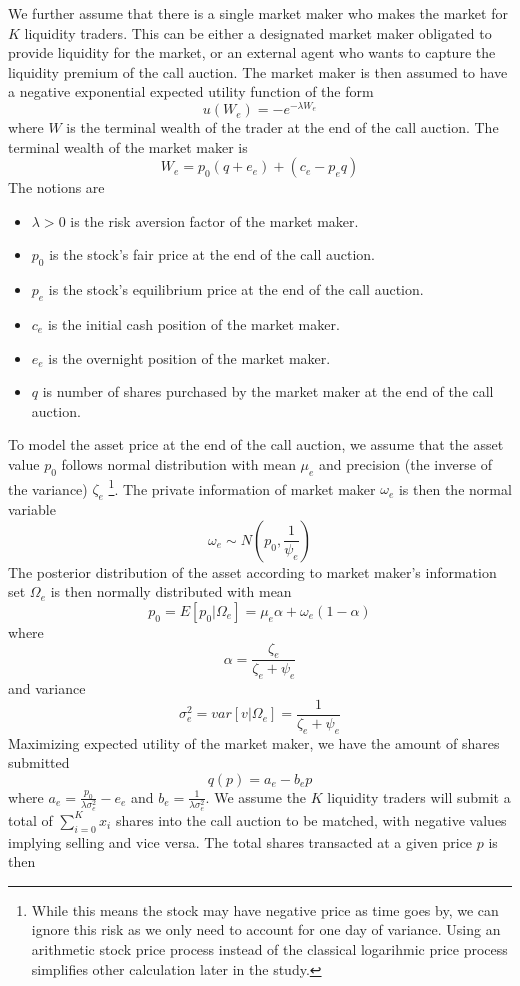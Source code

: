 We further assume that there is a single market maker who makes the market for $K$ liquidity traders. This can be either a designated market maker obligated to provide liquidity for the market, or an external agent who wants to capture the liquidity premium of the call auction. The market maker is then assumed to have a negative exponential expected utility function of the form
\[
  u(W_e) = -e^{-\lambda W_e}
\]
where $W$ is the terminal wealth of the trader at the end of the call auction. The terminal wealth of the market maker is
\[
  W_e = p_0 (q + e_e) + (c_e - p_e q)
\]
The notions are
\begin{itemize}
  \item $\lambda>0$ is the risk aversion factor of the market maker.
  \item $p_0$ is the stock's fair price at the end of the call auction.
  \item $p_e$ is the stock's equilibrium price at the end of the call auction.
  \item $c_e$ is the initial cash position of the market maker.
  \item $e_e$ is the overnight position of the market maker.
  \item $q$ is number of shares purchased by the market maker at the end of the call auction.
\end{itemize}
To model the asset price at the end of the call auction, we assume that the asset value $p_0$ follows normal distribution with mean $\mu_e$ and precision (the inverse of the variance) $\zeta_e$ \footnote{While this means the stock may have negative price as time goes by, we can ignore this risk as we only need to account for one day of variance. Using an arithmetic stock price process instead of the classical logarihmic price process simplifies other calculation later in the study.}. The private information of market maker $\omega_e$ is then the normal variable
\[
  \omega_e \sim N(p_0, \frac{1}{\psi_e})
\]
The posterior distribution of the asset according to market maker's information set $\Omega_e$ is then normally distributed with mean
\[
  p_0=E[p_0|\Omega_e]=\mu_e \alpha + \omega_e(1 - \alpha)
\]
where
\[
  \alpha = \frac{\zeta_e}{\zeta_e+\psi_e}
\]
and variance
\[
  \sigma_e^2=var[v|\Omega_e]=\frac{1}{\zeta_e+\psi_e}
\]
Maximizing expected utility of the market maker, we have the amount of shares submitted
\begin{equation}\label{eqn:mm_eval_eqb}
  q(p) = a_e - b_e p
\end{equation}
where $a_e = \frac{p_0}{\lambda \sigma_e^2} - e_e$ and $b_e=\frac{1}{\lambda \sigma_e^2}$. We assume the $K$ liquidity traders will submit a total of $\sum_{i=0}^K x_i$ shares into the call auction to be matched, with negative values implying selling and vice versa. The total shares transacted at a given price $p$ is then
